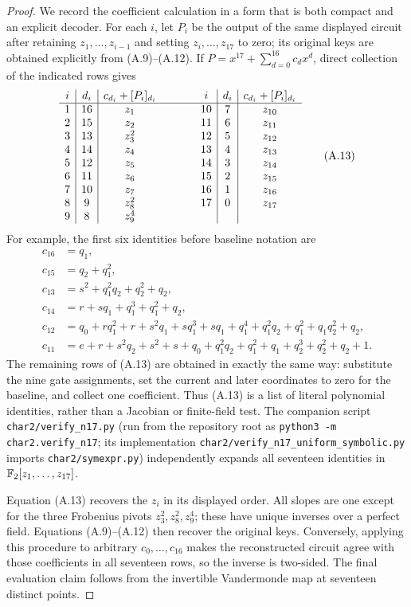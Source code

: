 \begin{proof}
We record the coefficient calculation in a form that is both compact and an
explicit decoder.  For each $i$, let $P_i$ be the output of the same displayed
circuit after retaining $z_1,\ldots,z_{i-1}$ and setting
$z_i,\ldots,z_{17}$ to zero; its original keys are obtained explicitly from
(A.9)--(A.12).  If $P=x^{17}+\sum_{d=0}^{16}c_dx^d$, direct collection of
the indicated rows gives
\[
\begin{array}{c|c|c@{\qquad\qquad}c|c|c}
i&d_i&c_{d_i}+[P_i]_{d_i}&i&d_i&c_{d_i}+[P_i]_{d_i}\\ \hline
1&16&z_1   &10&7&z_{10}\\
2&15&z_2   &11&6&z_{11}\\
3&13&z_3^2 &12&5&z_{12}\\
4&14&z_4   &13&4&z_{13}\\
5&12&z_5   &14&3&z_{14}\\
6&11&z_6   &15&2&z_{15}\\
7&10&z_7   &16&1&z_{16}\\
8&9 &z_8^2 &17&0&z_{17}\\
9&8 &z_9^4 &&&
\end{array}                                                       \tag{A.13}
\]
For example, the first six identities before baseline notation are
\[
\begin{aligned}
c_{16}&=q_1,\\
c_{15}&=q_2+q_1^2,\\
c_{13}&=s^2+q_1^2q_2+q_2^2+q_2,\\
c_{14}&=r+sq_1+q_1^3+q_1^2+q_2,\\
c_{12}&=q_0+rq_1^2+r+s^2q_1+sq_1^3+sq_1
          +q_1^4+q_1^2q_2+q_1^2+q_1q_2^2+q_2,\\
c_{11}&=e+r+s^2q_2+s^2+s+q_0+q_1^2q_2+q_1^2+q_1
          +q_2^3+q_2^2+q_2+1.
\end{aligned}                                                     \tag{A.14}
\]
The remaining rows of (A.13) are obtained in exactly the same way: substitute
the nine gate assignments, set the current and later coordinates to zero for
the baseline, and collect one coefficient.  Thus (A.13) is a list of literal
polynomial identities, rather than a Jacobian or finite-field test.  The
companion script \texttt{char2/verify\_n17.py} (run from the repository root
as \texttt{python3 -m char2.verify\_n17}; its implementation
\texttt{char2/verify\_n17\_uniform\_symbolic.py} imports
\texttt{char2/symexpr.py}) independently
expands all seventeen identities in $\mathbb{F}_2[z_1,\ldots,z_{17}]$.

Equation (A.13) recovers the $z_i$ in its displayed order.  All slopes are
one except for the three Frobenius pivots $z_3^2,z_8^2,z_9^4$; these have
unique inverses over a perfect field.  Equations (A.9)--(A.12) then recover
the original keys.  Conversely, applying this procedure to arbitrary
$c_0,\ldots,c_{16}$ makes the reconstructed circuit agree with those
coefficients in all seventeen rows, so the inverse is two-sided.  The final
evaluation claim follows from the invertible Vandermonde map at seventeen
distinct points.
\end{proof}

